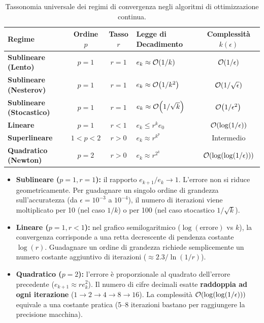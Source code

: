 \begin{table}[H]
\centering
\footnotesize
\renewcommand{\arraystretch}{1.3}
\begin{tabularx}{\textwidth}{l c c X c}
\toprule
\textbf{Regime} & \textbf{Ordine $p$} & \textbf{Tasso $r$} & \textbf{Legge di Decadimento} & \textbf{Complessit\`a $k(\epsilon)$} \\
\midrule
\textbf{Sublineare (Lento)}  & $p = 1$ & $r = 1$ & $e_k \approx \mathcal{O}\!\left(1/k\right)$          & $\mathcal{O}\!\left(1/\epsilon\right)$ \\
\textbf{Sublineare (Nesterov)} & $p = 1$ & $r = 1$ & $e_k \approx \mathcal{O}\!\left(1/k^2\right)$        & $\mathcal{O}\!\left(1/\sqrt{\epsilon}\right)$ \\
\textbf{Sublineare (Stocastico)} & $p = 1$ & $r = 1$ & $e_k \approx \mathcal{O}\!\left(1/\sqrt{k}\right)$ & $\mathcal{O}\!\left(1/\epsilon^2\right)$ \\
\textbf{Lineare}             & $p = 1$ & $r < 1$ & $e_k \le r^k e_0$                 & $\mathcal{O}\!\left(\log(1/\epsilon)\right)$ \\
\textbf{Superlineare}        & $1 < p < 2$ & $r > 0$ & $e_k \approx r^{k^p}$           & Intermedio \\
\textbf{Quadratico (Newton)} & $p = 2$ & $r > 0$ & $e_k \approx r^{2^k}$             & $\mathcal{O}\!\left(\log(\log(1/\epsilon))\right)$ \\
\bottomrule
\end{tabularx}
\caption{Tassonomia universale dei regimi di convergenza negli algoritmi di ottimizzazione continua.}
\label{tab:regimi-convergenza}
\end{table}

\begin{itemize}
    \item \textbf{Sublineare ($p=1, r=1$):} il rapporto $e_{k+1}/e_k \to 1$. L'errore non si riduce geometricamente. Per guadagnare un singolo ordine di grandezza sull'accuratezza (da $\epsilon = 10^{-3}$ a $10^{-4}$), il numero di iterazioni viene moltiplicato per 10 (nel caso $1/k$) o per 100 (nel caso stocastico $1/\sqrt{k}$).
    \item \textbf{Lineare ($p=1, r<1$):} nel grafico semilogaritmico ($\log(\text{errore})$ vs $k$), la convergenza corrisponde a una retta decrescente di pendenza costante $\log(r)$. Guadagnare un ordine di grandezza richiede semplicemente un numero costante aggiuntivo di iterazioni ($\approx 2.3 / \ln(1/r)$).
    \item \textbf{Quadratico ($p=2$):} l'errore \`e proporzionale al quadrato dell'errore precedente ($e_{k+1} \approx r e_k^2$). Il numero di cifre decimali esatte \textbf{raddoppia ad ogni iterazione} ($1 \to 2 \to 4 \to 8 \to 16$). La complessit\`a $\mathcal{O}\!\left(\log(\log(1/\epsilon))\right)$ equivale a una costante pratica (5--8 iterazioni bastano per raggiungere la precisione macchina).
\end{itemize}

